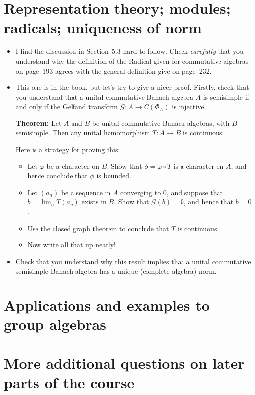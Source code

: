 \documentclass[twoside,12pt,a4paper]{article}
\newcommand{\mc}{\mathcal}
\begin{document}
\section{Representation theory; modules; radicals; uniqueness of norm}

\begin{itemize}
\item I find the discussion in Section~5.3 hard to follow.
Check \emph{carefully} that you understand why the definition of the
Radical given for commutative algebras on page~193 agrees with the general
definition give on page~232.

\item This one is in the book, but let's try to give a nicer proof.
Firstly, check that you understand that a unital commutative Banach
algebra $A$ is semisimple if and only if the Gelfand transform
$\mc G:A\rightarrow C(\Phi_A)$ is injective.

\smallskip
\noindent\textbf{Theorem:} Let $A$ and $B$ be unital commutative Banach
algebras, with $B$ semisimple.  Then any unital homomorphism $T:A\rightarrow B$
is continuous.
\smallskip

Here is a strategy for proving this:
\begin{itemize}
\item Let $\varphi$ be a character on $B$.  Show that $\phi = \varphi\circ T$
is a character on $A$, and hence conclude that $\phi$ is bounded.
\item Let $(a_n)$ be a sequence in $A$ converging to $0$, and suppose
that $b = \lim_n T(a_n)$ exists in $B$.  Show that $\mc G(b)=0$, and hence that
$b=0$.
\item Use the closed graph theorem to conclude that $T$ is continuous.
\item Now write all that up neatly!
\end{itemize}
\item Check that you understand why this result implies that a unital commutative
semisimple Banach algebra has a unique (complete algebra) norm.
\end{itemize}



\section{Applications and examples to group algebras}




\section{More additional questions on later parts of the course}
\end{document}
